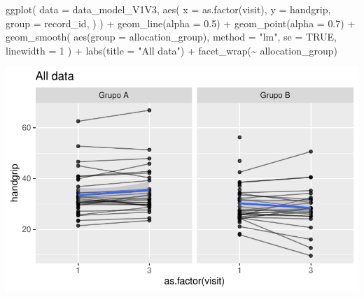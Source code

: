 \documentclass[
  12pt,
]{article}
\newenvironment{Shaded}{\begin{snugshade}}{\end{snugshade}}
\newcommand{\AttributeTok}[1]{\textcolor[rgb]{0.40,0.45,0.13}{#1}}
\newcommand{\ConstantTok}[1]{\textcolor[rgb]{0.56,0.35,0.01}{#1}}
\newcommand{\DecValTok}[1]{\textcolor[rgb]{0.68,0.00,0.00}{#1}}
\newcommand{\FloatTok}[1]{\textcolor[rgb]{0.68,0.00,0.00}{#1}}
\newcommand{\FunctionTok}[1]{\textcolor[rgb]{0.28,0.35,0.67}{#1}}
\newcommand{\NormalTok}[1]{\textcolor[rgb]{0.00,0.23,0.31}{#1}}
\newcommand{\SpecialCharTok}[1]{\textcolor[rgb]{0.37,0.37,0.37}{#1}}
\newcommand{\StringTok}[1]{\textcolor[rgb]{0.13,0.47,0.30}{#1}}
\begin{document}
\begin{Shaded}
\begin{Highlighting}[]
\FunctionTok{ggplot}\NormalTok{(}
    \AttributeTok{data =}\NormalTok{ data\_model\_V1V3, }
    \FunctionTok{aes}\NormalTok{(}
        \AttributeTok{x =} \FunctionTok{as.factor}\NormalTok{(visit),}
        \AttributeTok{y =}\NormalTok{ handgrip,}
        \AttributeTok{group =}\NormalTok{ record\_id,}
\NormalTok{    )}
\NormalTok{) }\SpecialCharTok{+}
    \FunctionTok{geom\_line}\NormalTok{(}\AttributeTok{alpha =} \FloatTok{0.5}\NormalTok{) }\SpecialCharTok{+}
    \FunctionTok{geom\_point}\NormalTok{(}\AttributeTok{alpha =} \FloatTok{0.7}\NormalTok{) }\SpecialCharTok{+}
    \FunctionTok{geom\_smooth}\NormalTok{(}
        \FunctionTok{aes}\NormalTok{(}\AttributeTok{group =}\NormalTok{ allocation\_group),}
        \AttributeTok{method =} \StringTok{"lm"}\NormalTok{,}
        \AttributeTok{se =} \ConstantTok{TRUE}\NormalTok{,}
        \AttributeTok{linewidth =} \DecValTok{1}
\NormalTok{    ) }\SpecialCharTok{+}
    \FunctionTok{labs}\NormalTok{(}\AttributeTok{title =} \StringTok{"All data"}\NormalTok{) }\SpecialCharTok{+}
    \FunctionTok{facet\_wrap}\NormalTok{(}\SpecialCharTok{\textasciitilde{}}\NormalTok{ allocation\_group)}
\end{Highlighting}
\end{Shaded}

\includegraphics{Outcomes_files/figure-pdf/handgrip_6-1.pdf}
\end{document}
